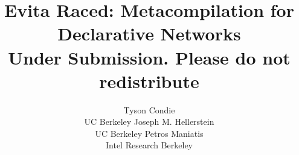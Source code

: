 \documentclass{sigmod08}
\begin{document}
%


\title{Evita Raced: Metacompilation for Declarative Networks\\
{\large Under Submission. Please do not redistribute}}


\author{
\alignauthor Tyson Condie\\
\affaddr UC Berkeley
\alignauthor Joseph M. Hellerstein\\
\affaddr UC Berkeley
\alignauthor Petros Maniatis\\
\affaddr Intel Research Berkeley
%
%
}

\maketitle
\end{document}
